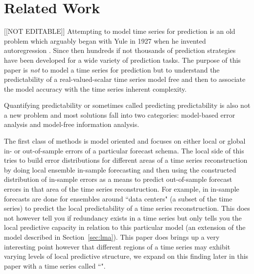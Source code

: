 \section{Related Work }\label{sec:related}
{\color{red}[[NOT EDITABLE]]}
Attempting to model time series for prediction is an  old problem which arguably began with Yule in 1927 when he invented autoregression \cite{Yule27}. Since then hundreds if not thousands of prediction strategies have been developed for a wide variety of prediction tasks. The purpose of this paper is \emph{not} to model a time series for prediction but to understand the predictability of a real-valued-scalar time series model free and then to associate the model accuracy with the time series inherent complexity. 

Quantifying predictability or sometimes called predicting predictability is also not a new problem and most solutions fall into two categories: model-based error analysis and model-free information analysis.





The first class of methods is model oriented and focuses on either local or global in- or out-of-sample errors of a particular forecast schema. The local side of this tries to build error distributions for different areas of a time series reconstruction by doing local ensemble in-sample forecasting and then using the constructed distribution of in-sample errors as a means to predict out-of-sample forecast errors in that area of the time series reconstruction. For example, in \cite{Smith199250} in-sample forecasts are done for ensembles around ``data centers" (a subset of the time series) to predict the local predictability of a time series reconstruction. This does not however tell you if redundancy exists in a time series but only tells you the local predictive capacity in relation to this particular model (an extension of the model described in Section~\ref{sec:lma}). This paper does brings up a very interesting point however that different regions of a time series may exhibit varying levels of local predictive structure, we expand on this finding later in this paper with a time series called ``\svd".


